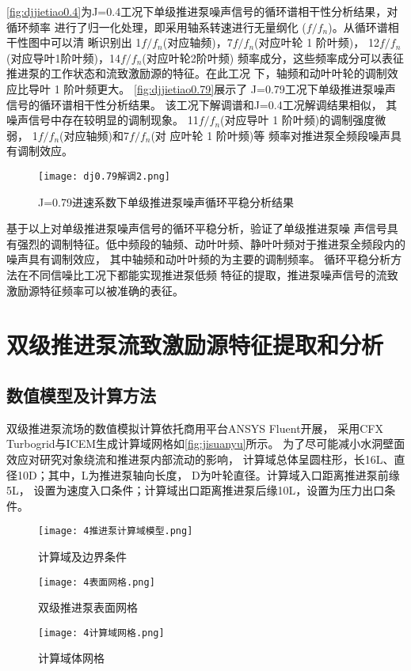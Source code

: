 \autoref{fig:djjietiao0.4}为J=0.4工况下单级推进泵噪声信号的循环谱相干性分析结果，对循环频率
进行了归一化处理，即采用轴系转速进行无量纲化 ($f/f_n$)。从循环谱相干性图中可以清
晰识别出 1$f/f_n$(对应轴频)，7$f/f_n$(对应叶轮 1 阶叶频)，
12$f/f_n$(对应导叶1阶叶频)，14$f/f_n$(对应叶轮2阶叶频)
频率成分，这些频率成分可以表征推进泵的工作状态和流致激励源的特征。在此工况
下，轴频和动叶叶轮的调制效应比导叶 1 阶叶频更大。
\autoref{fig:djjietiao0.79}展示了 J=0.79工况下单级推进泵噪声信号的循环谱相干性分析结果。
该工况下解调谱和J=0.4工况解调结果相似，
其噪声信号中存在较明显的调制现象。
11$f/f_n$(对应导叶 1 阶叶频)的调制强度微弱，
1$f/f_n$(对应轴频)和7$f/f_n$(对
应叶轮 1 阶叶频)等
频率对推进泵全频段噪声具有调制效应。
\begin{figure}[htbp]
    \centering
    \texttt{[image: dj0.79解调2.png]}
    \caption{\label{fig:djjietiao0.79}J=0.79进速系数下单级推进泵噪声循环平稳分析结果}
\end{figure}

基于以上对单级推进泵噪声信号的循环平稳分析，验证了单级推进泵噪
声信号具有强烈的调制特征。低中频段的轴频、动叶叶频、静叶叶频对于推进泵全频段内的噪声具有调制效应，
其中轴频和动叶叶频的为主要的调制频率。
循环平稳分析方法在不同信噪比工况下都能实现推进泵低频
特征的提取，推进泵噪声信号的流致激励源特征频率可以被准确的表征。
\begin{comment}
\begin{figure}[htbp]
    \centering
    \texttt{[image: dj1.2解调1.png]}
    \caption{\label{fig:djjietiao1.2}J=1.2进速系数下单级推进泵噪声循环平稳分析结果}
\end{figure}
\end{comment}
\section{双级推进泵流致激励源特征提取和分析}
\subsection{数值模型及计算方法}
双级推进泵流场的数值模拟计算依托商用平台ANSYS Fluent开展，
采用CFX Turbogrid与ICEM生成计算域网格如\autoref{fig:jisuanyu}所示。
为了尽可能减小水洞壁面效应对研究对象绕流和推进泵内部流动的影响，
计算域总体呈圆柱形，长16L、直径10D；其中，L为推进泵轴向长度，
D为叶轮直径。计算域入口距离推进泵前缘5L，
设置为速度入口条件；计算域出口距离推进泵后缘10L，设置为压力出口条件。
\begin{figure}[htbp]
    \centering
    \texttt{[image: 4推进泵计算域模型.png]}
    \caption{\label{fig:jisuanyu}计算域及边界条件}
\end{figure}
\begin{figure}[htbp]
    \centering
    \texttt{[image: 4表面网格.png]}
    \caption{\label{fig:sjwangge}双级推进泵表面网格}
\end{figure}
\begin{figure}[htbp]
    \centering
    \texttt{[image: 4计算域网格.png]}
    \caption{\label{fig:jisuanyuwangge}计算域体网格}
\end{figure}

